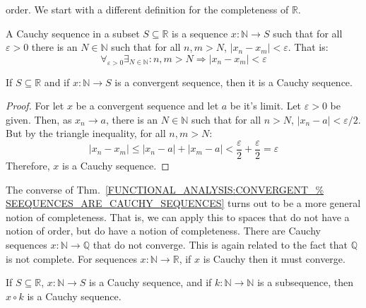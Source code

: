     order. We start with a different definition
    for the completeness of $\mathbb{R}$.
    \begin{definition}
        A Cauchy sequence in a subset
        $S\subseteq\mathbb{R}$ is a
        sequence $x:\mathbb{N}\rightarrow{S}$
        such that for all $\varepsilon>0$ there
        is an $N\in\mathbb{N}$ such that for all
        $n,m>N$, $|x_{n}-x_{m}|<\varepsilon$.
        That is:
        \begin{equation}
            \label{thm:Func_Def_Cauchy_Sequence}
            \forall_{\varepsilon>0}
            \exists_{N\in\mathbb{N}}:
            n,m>N\Rightarrow
            |x_{n}-x_{m}|<\varepsilon
        \end{equation}
    \end{definition}
    \begin{theorem}
        \label{FUNCTIONAL_ANALYSIS:CONVERGENT_%
               SEEQUENCES_ARE_CAUCHY_SEQUENCES}
        If $S\subseteq\mathbb{R}$ and if
        $x:\mathbb{N}\rightarrow{S}$
        is a convergent sequence, then it
        is a Cauchy sequence.
    \end{theorem}
    \begin{proof}
        For let $x$ be a convergent sequence and
        let $a$ be it's limit.
        Let $\varepsilon>0$ be given. Then, as
        $x_{n}\rightarrow{a}$, there is an
        $N\in\mathbb{N}$ such that for all $n>N$,
        $|x_{n}-a|<\varepsilon/2$.
        But by the triangle inequality,
        for all $n,m>N$:
        \begin{equation}
            |x_{n}-x_{m}|\leq
            |x_{n}-a|+|x_{m}-a|<
            \frac{\varepsilon}{2}+
            \frac{\varepsilon}{2}
            =\varepsilon
        \end{equation}
        Therefore, $x$ is a Cauchy sequence.
    \end{proof}
    The converse of
    Thm.~\ref{FUNCTIONAL_ANALYSIS:CONVERGENT_%
              SEEQUENCES_ARE_CAUCHY_SEQUENCES}
    turns out to be a more general notion
    of completeness. That is, we can apply
    this to spaces that do not have
    a notion of order, but do have a notion
    of completeness. There are Cauchy sequences
    $x:\mathbb{N}\rightarrow\mathbb{Q}$ that do
    not converge. This is again related to the fact
    that $\mathbb{Q}$ is not complete. For sequences
    $x:\mathbb{N}\rightarrow\mathbb{R}$,
    if $x$ is Cauchy then it must converge.
    \begin{theorem}
        \label{THM:FUNCTIONAL_ANALYSIS:%
               SUBSEQ_OF_CAUCHY_IS_CAUCHY}
        If $S\subseteq\mathbb{R}$,
        $x:\mathbb{N}\rightarrow{S}$ is a Cauchy sequence,
        and if $k:\mathbb{N}\rightarrow\mathbb{N}$
        is a subsequence, then
        $x\circ{k}$ is a Cauchy sequence.
    \end{theorem}
